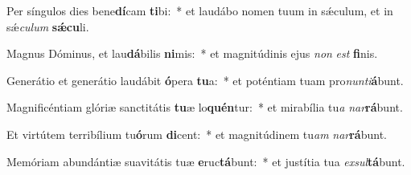 \item Per síngulos dies bene\textbf{dí}cam \textbf{ti}bi:~* et laudábo nomen tuum in sǽculum, et in sǽ\textit{cu}\textit{lum} \textbf{sǽ}\textbf{cu}li.
\item Magnus Dóminus, et lau\textbf{dá}bilis \textbf{ni}mis:~* et magnitúdinis ejus \textit{non} \textit{est} \textbf{fi}nis.
\item Generátio et generátio laudábit \textbf{ó}pera \textbf{tu}a:~* et poténtiam tuam pro\textit{nun}\textit{ti}\textbf{á}bunt.
\item Magnificéntiam glóriæ sanctitátis \textbf{tu}æ lo\textbf{quén}tur:~* et mirabília tu\textit{a} \textit{nar}\textbf{rá}bunt.
\item Et virtútem terribílium tu\textbf{ó}rum \textbf{di}cent:~* et magnitúdinem tu\textit{am} \textit{nar}\textbf{rá}bunt.
\item Memóriam abundántiæ suavitátis tuæ \textbf{e}ruc\textbf{tá}bunt:~* et justítia tua \textit{ex}\textit{sul}\textbf{tá}bunt.

